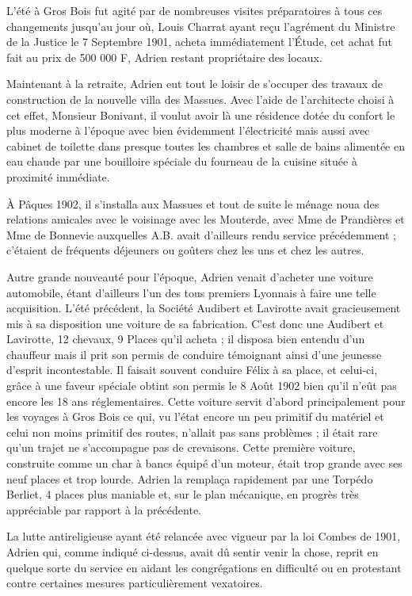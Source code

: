 \documentclass[11pt,a4paper]{report}
\begin{document}
L'été à Gros Bois fut agité par de nombreuses visites préparatoires à tous ces changements jusqu'au jour où, Louis Charrat ayant reçu l'agrément du Ministre de la Justice le 7 Septembre 1901, acheta immédiatement l'Étude, cet achat fut fait au prix de 500 000 F, Adrien restant propriétaire des locaux.


Maintenant à la retraite, Adrien eut tout le loisir de s'occuper des travaux de construction de la nouvelle villa des Massues. Avec l'aide de l'architecte choisi à cet effet, Monsieur Bonivant, il voulut avoir là une résidence dotée du confort le plus moderne à l'époque avec bien évidemment l'électricité mais aussi avec cabinet de toilette dans presque toutes les chambres et salle de bains alimentée en eau chaude par une bouilloire spéciale du fourneau de la cuisine située à proximité immédiate.

À Pâques 1902, il s'installa aux Massues et tout de suite le ménage noua des relations amicales avec le voisinage avec les Mouterde, avec Mme de Prandières et Mme de Bonnevie auxquelles A.B. avait d'ailleurs rendu service précédemment ; c'étaient de fréquents déjeuners ou goûters chez les uns et chez les autres.

Autre grande nouveauté pour l'époque, Adrien venait d'acheter une voiture automobile, étant d'ailleurs l'un des tous premiers Lyonnais à faire une telle acquisition. L'été précédent, la Société Audibert et Lavirotte avait gracieusement mis à sa disposition une voiture de sa fabrication. C'est donc une Audibert et Lavirotte, 12 chevaux, 9 Places qu'il acheta ; il disposa bien entendu d'un chauffeur mais il prit son permis de conduire témoignant ainsi d'une jeunesse d'esprit incontestable. Il faisait souvent conduire Félix à sa place, et celui-ci, grâce à une faveur spéciale obtint son permis le 8 Août 1902 bien qu'il n'eût pas encore les 18 ans réglementaires. Cette voiture servit d'abord principalement pour les voyages à Gros Bois ce qui, vu l'état encore un peu primitif du matériel et celui non moins primitif des routes, n'allait pas sans problèmes ; il était rare qu'un trajet ne s'accompagne pas de crevaisons. Cette première voiture, construite comme un char à bancs équipé d'un moteur, était trop grande avec ses neuf places et trop lourde. Adrien la remplaça rapidement par une Torpédo Berliet, 4 places plus maniable et, sur le plan mécanique, en progrès très appréciable par rapport à la précédente.

La lutte antireligieuse ayant été relancée avec vigueur par la loi Combes de 1901, Adrien qui, comme indiqué ci-dessus, avait dû sentir venir la chose, reprit en quelque sorte du service en aidant les congrégations en difficulté ou en protestant contre certaines mesures particulièrement vexatoires.
\end{document}
